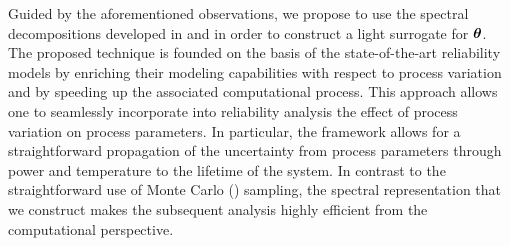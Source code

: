 Guided by the aforementioned observations, we propose to use the spectral decompositions developed in  and  in order to construct a light surrogate for $\bm{\theta}$.
The proposed technique is founded on the basis of the state-of-the-art reliability models by enriching their modeling capabilities with respect to process variation and by speeding up the associated computational process.
This approach allows one to seamlessly incorporate into reliability analysis the effect of process variation on process parameters.
In particular, the framework allows for a straightforward propagation of the uncertainty from process parameters through power and temperature to the lifetime of the system.
In contrast to the straightforward use of Monte Carlo () sampling, the spectral representation that we construct makes the subsequent analysis highly efficient from the computational perspective.

